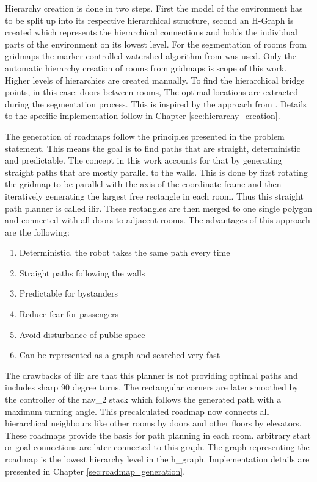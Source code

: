 Hierarchy creation is done in two steps. First the model of the environment has to be split up into its respective hierarchical structure, second an H-Graph is created which represents the hierarchical connections and holds the individual parts of the environment on its lowest level. For the segmentation of rooms from gridmaps the marker-controlled watershed algorithm from \cite{parvati_image_2009} was used. Only the automatic hierarchy creation of rooms from gridmaps is scope of this work. Higher levels of hierarchies are created manually. To find the hierarchical bridge points, in this case: doors between rooms, The optimal locations are extracted during the segmentation process. This is inspired by the approach from \cite{ryu_hierarchical_2020}. Details to the specific implementation follow in Chapter \ref{sec:hierarchy_creation}.

The generation of roadmaps follow the principles presented in the problem statement. This means the goal is to find paths that are straight, deterministic and predictable. The concept in this work accounts for that by generating straight paths that are mostly parallel to the walls. This is done by first rotating the gridmap to be parallel with the axis of the coordinate frame and then iteratively generating the largest free rectangle in each room. Thus this straight path planner is called \gls{ilir}. These rectangles are then merged to one single polygon and connected with all doors to adjacent rooms. The advantages of this approach are the following:

\begin{enumerate}
    \item Deterministic, the robot takes the same path every time
    \item Straight paths following the walls
    \item Predictable for bystanders
    \item Reduce fear for passengers
    \item Avoid disturbance of public space
    \item Can be represented as a graph and searched very fast
\end{enumerate}

The drawbacks of \gls{ilir} are that this planner is not providing optimal paths and includes sharp 90 degree turns. The rectangular corners are later smoothed by the controller of the \gls{nav_2} stack which follows the generated path with a maximum turning angle. This precalculated roadmap now connects all hierarchical neighbours like other rooms by doors and other floors by elevators. These roadmaps provide the basis for path planning in each room. arbitrary start or goal connections are later connected to this graph. The graph representing the roadmap is the lowest hierarchy level in the \gls{h_graph}. Implementation details are presented in Chapter \ref{sec:roadmap_generation}.

